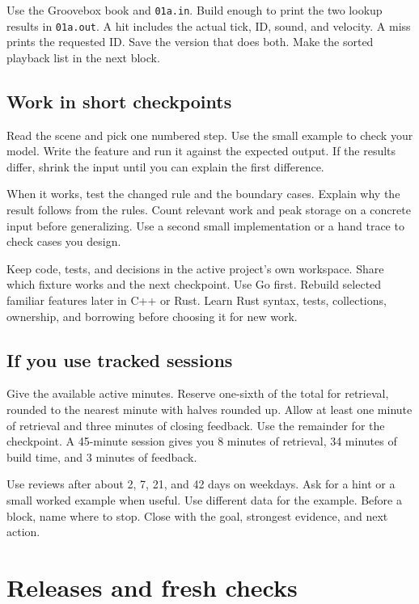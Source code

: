 \documentclass[11pt,letterpaper]{article}
\begin{document}
Use the Groovebox book and \texttt{01a.in}. Build enough to print the two lookup results in \texttt{01a.out}. A hit includes the actual tick, ID, sound, and velocity. A miss prints the requested ID. Save the version that does both. Make the sorted playback list in the next block.

\subsection*{Work in short checkpoints}

Read the scene and pick one numbered step. Use the small example to check your model. Write the feature and run it against the expected output. If the results differ, shrink the input until you can explain the first difference.

When it works, test the changed rule and the boundary cases. Explain why the result follows from the rules. Count relevant work and peak storage on a concrete input before generalizing. Use a second small implementation or a hand trace to check cases you design.

Keep code, tests, and decisions in the active project's own workspace. Share which fixture works and the next checkpoint. Use Go first. Rebuild selected familiar features later in C++ or Rust. Learn Rust syntax, tests, collections, ownership, and borrowing before choosing it for new work.

\subsection*{If you use tracked sessions}

Give the available active minutes. Reserve one-sixth of the total for retrieval, rounded to the nearest minute with halves rounded up. Allow at least one minute of retrieval and three minutes of closing feedback. Use the remainder for the checkpoint. A 45-minute session gives you 8 minutes of retrieval, 34 minutes of build time, and 3 minutes of feedback.

Use reviews after about 2, 7, 21, and 42 days on weekdays. Ask for a hint or a small worked example when useful. Use different data for the example. Before a block, name where to stop. Close with the goal, strongest evidence, and next action.

\section{Releases and fresh checks}
\end{document}

